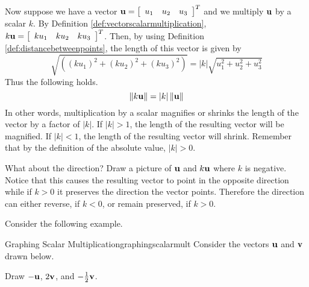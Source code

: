 Now suppose we have a vector ${\bf u} = \left[ 
\begin{array}{lll}
u_1 &  u_2 & u_3 
\end{array}
\right]^T$ and we multiply ${\bf u}$ by a
scalar $k$. By Definition \ref{def:vectorscalarmultiplication},
$k{\bf u} = \left[
\begin{array}{rrr}
ku_{1} & ku_{2} & ku_{3}
\end{array}
\right]^T $. 
Then, by using Definition \ref{def:distancebetweenpoints}, the length of this vector is given by 
\begin{equation*}
\sqrt{\left( \left( k u_{1}\right) ^{2}+\left( k u_{2}\right)
^{2}+\left( k u_{3}\right) ^{2}\right) }=\left\vert k \right\vert
\sqrt{u_{1}^{2}+u_{2}^{2}+u_{3}^{2}}
\end{equation*}
Thus the following holds.
\begin{equation*}
\| k {\bf u} \| =\left\vert k \right\vert
\| {\bf u} \| 
\end{equation*}
In other words, multiplication by a scalar magnifies or shrinks the length
of the vector by a factor of $\left\vert k \right\vert$. If $\left\vert k \right\vert > 1$, the length of the resulting vector will 
be magnified. If $\left\vert k \right\vert <1$, the length of the resulting vector will shrink. Remember that by the definition 
of the absolute value, $\left\vert k \right\vert >0$. 

What about the direction? Draw a picture of ${\bf u}$ and $k{\bf u}$
where $k$ is negative. Notice that this causes the resulting vector
to point in the opposite direction while if $k >0$ it preserves the
direction the vector points. Therefore the direction can either
reverse, if $k < 0$, or remain preserved, if $k > 0$.

Consider the following example.

\begin{example}{Graphing Scalar Multiplication}{graphingscalarmult}
Consider the vectors ${\bf u}$ and ${\bf v}$ drawn below. 

\begin{center}
\end{center}

Draw  $-{\bf u}$, $2{\bf v}$, and $-\frac{1}{2}{\bf v}$.
\end{example}

